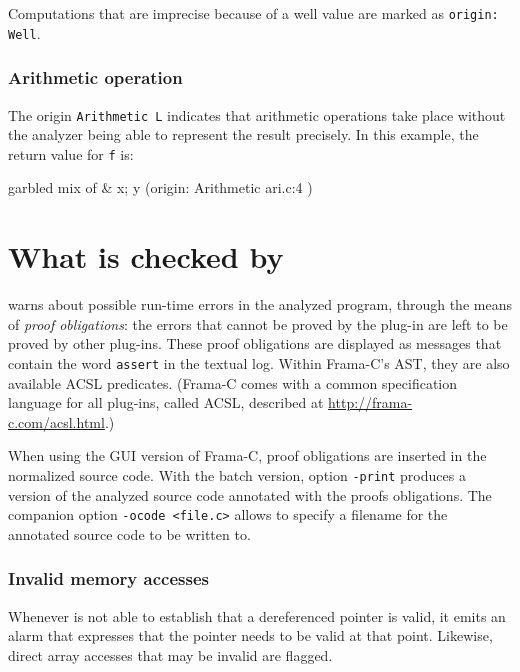 \documentclass{frama-c-book}
\begin{document}
Computations that are imprecise because of a well value are marked
as \lstinline|origin: Well|.

\subsubsection{Arithmetic operation}
The origin \lstinline$Arithmetic L$
indicates that arithmetic operations
take place without the analyzer being able to represent the result
precisely.
In this example, the return value for \lstinline|f| is:

\begin{logs}
{{ garbled mix of &{ x; y } (origin: Arithmetic { ari.c:4 }) }}
\end{logs}

\section{What is checked by \Eva{}}\label{obligations}

\Eva{} warns about possible run-time errors in the analyzed
program, through the means of \emph{proof obligations}: the errors that cannot
be proved by the \Eva{} plug-in are left to be proved by other plug-ins.
These proof obligations
are displayed as messages that contain the word \lstinline|assert| in
the textual log. Within Frama-C's AST, they are also available ACSL predicates.
(Frama-C comes with a common specification language for all plug-ins,
called ACSL, described at \url{http://frama-c.com/acsl.html}.)

When using the GUI version of Frama-C, proof obligations are
inserted in the normalized source code. With the batch version,
option \lstinline|-print| produces a version of the analyzed source code
annotated with the proofs obligations.  The companion option
\lstinline|-ocode <file.c>| allows to specify a filename for the
annotated source code to be written to.

\subsubsection{Invalid memory accesses}
Whenever \Eva{} is not able to establish that
a dereferenced pointer is valid, it emits an alarm that expresses
that the pointer needs to be valid at that point. Likewise, direct
array accesses that may be invalid are flagged.
\end{document}

